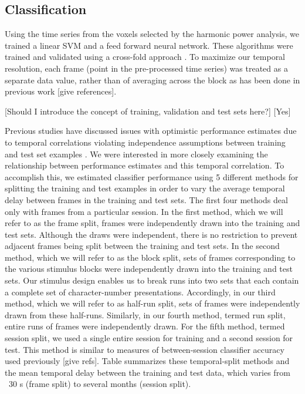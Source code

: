 \documentclass[final]{article}
\begin{document}
\subsection{Classification}
Using the time series from the voxels selected by the harmonic power analysis, we trained a linear SVM and a feed forward neural network.
These algorithms were trained and validated using a cross-fold approach \cite{Kohavi1995}.
To maximize our temporal resolution, each frame (point in the pre-processed time series) was treated 
as a separate data value, rather than  of averaging across the block as has been  done in previous work 
[give references].

[Should I introduce the concept of training, validation and test sets here?] [Yes]

Previous studies have discussed issues with optimistic performance estimates due to temporal correlations violating independence assumptions between training and test set examples \cite{Pereira2009}.
We were interested in more closely examining the relationship between performance estimates and this temporal correlation.
To accomplish this, we estimated classifier performance using 5 different methods for splitting the 
training and test examples in order to vary the average temporal delay between frames in the training 
and test sets. The first four methods deal only with frames from a particular session.
In the first method, which we will refer to as the frame split, frames were independently drawn into the 
training and test sets. Although the draws were independent, there is no restriction to prevent adjacent 
frames being split between the training and test sets.
In the second method, which we will refer to as the block split, sets of frames corresponding to the 
various stimulus blocks were independently drawn into the training and test sets.
Our stimulus design enables us to break runs into two sets that each contain a complete set of 
character-number presentations. Accordingly, in our third method, which we will refer to as half-run 
split, sets of frames were independently drawn from these half-runs. Similarly, in our fourth method, 
termed run split, entire runs of frames were independently drawn. For the fifth method, termed session
split, we used a single entire session for training and a second session for test.
This method is similar to measures of between-session classifier accuracy used previously [give refs].
Table \cite{tempSplitTable} summarizes these temporal-split methods and the mean temporal delay between the 
training and test data, which varies from ~30 s (frame split) to several months (session split).
\end{document}
